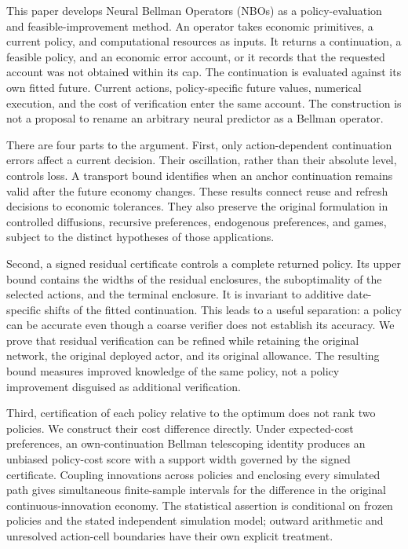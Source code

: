 \documentclass[ecta,nameyear,draft]{econsocart}
\begin{document}
This paper develops Neural Bellman Operators (NBOs) as a policy-evaluation and feasible-improvement method. An operator takes economic primitives, a current policy, and computational resources as inputs. It returns a continuation, a feasible policy, and an economic error account, or it records that the requested account was not obtained within its cap. The continuation is evaluated against its own fitted future. Current actions, policy-specific future values, numerical execution, and the cost of verification enter the same account. The construction is not a proposal to rename an arbitrary neural predictor as a Bellman operator.

There are four parts to the argument. First, only action-dependent continuation errors affect a current decision. Their oscillation, rather than their absolute level, controls loss. A transport bound identifies when an anchor continuation remains valid after the future economy changes. These results connect reuse and refresh decisions to economic tolerances. They also preserve the original formulation in controlled diffusions, recursive preferences, endogenous preferences, and games, subject to the distinct hypotheses of those applications.

Second, a signed residual certificate controls a complete returned policy. Its upper bound contains the widths of the residual enclosures, the suboptimality of the selected actions, and the terminal enclosure. It is invariant to additive date-specific shifts of the fitted continuation. This leads to a useful separation: a policy can be accurate even though a coarse verifier does not establish its accuracy. We prove that residual verification can be refined while retaining the original network, the original deployed actor, and its original allowance. The resulting bound measures improved knowledge of the same policy, not a policy improvement disguised as additional verification.

Third, certification of each policy relative to the optimum does not rank two policies. We construct their cost difference directly. Under expected-cost preferences, an own-continuation Bellman telescoping identity produces an unbiased policy-cost score with a support width governed by the signed certificate. Coupling innovations across policies and enclosing every simulated path gives simultaneous finite-sample intervals for the difference in the original continuous-innovation economy. The statistical assertion is conditional on frozen policies and the stated independent simulation model; outward arithmetic and unresolved action-cell boundaries have their own explicit treatment.
\end{document}
